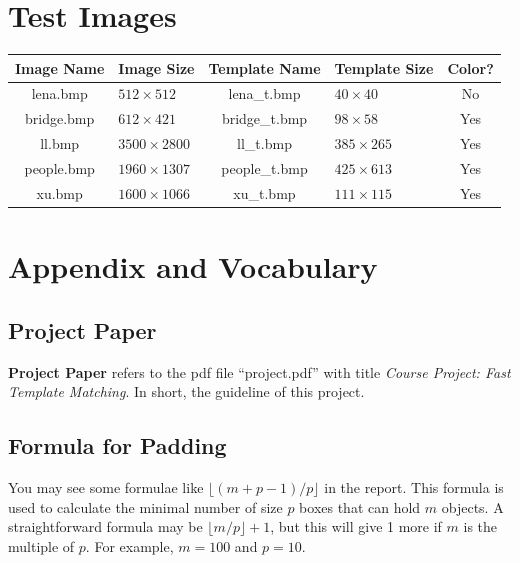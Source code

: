 \documentclass[12pt, a4paper]{article}
\begin{document}
\section{Test Images}
  \begin{tabular}{|c|l|c|l|c|}
    \hline
    Image Name & Image Size       & Template Name & Template Size  & Color? \\\hline
    lena.bmp   & $512\times512$   & lena\_t.bmp   & $40\times40$   & No     \\\hline
    bridge.bmp & $612\times421$   & bridge\_t.bmp & $98\times58$   & Yes    \\\hline
    ll.bmp     & $3500\times2800$ & ll\_t.bmp     & $385\times265$ & Yes    \\\hline
    people.bmp & $1960\times1307$ & people\_t.bmp & $425\times613$ & Yes    \\\hline
    xu.bmp     & $1600\times1066$ & xu\_t.bmp     & $111\times115$ & Yes    \\\hline
  \end{tabular}

\section{Appendix and Vocabulary}
  \subsection{Project Paper}
    \textbf{Project Paper} refers to the pdf file ``project.pdf'' with title
    \textit{Course Project: Fast Template Matching}. In short, the guideline
    of this project.
  \subsection{Formula for Padding}
    You may see some formulae like $\lfloor(m+p-1)/p\rfloor$ in the report. This
    formula is used to calculate the minimal number of size $p$ boxes that can
    hold $m$ objects. A straightforward formula may be $\lfloor m/p\rfloor+1$,
    but this will give 1 more if $m$ is the multiple of $p$. For example, $m=100$
    and $p=10$.
\end{document}
